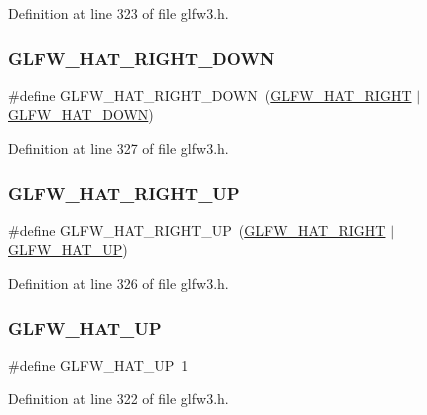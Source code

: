 Definition at line 323 of file glfw3.\+h.

\mbox{\label{group__hat__state_gad7f0e4f52fd68d734863aaeadab3a3f5}} 
\subsubsection{\texorpdfstring{GLFW\_HAT\_RIGHT\_DOWN}{GLFW\_HAT\_RIGHT\_DOWN}}
{\footnotesize\ttfamily \#define G\+L\+F\+W\+\_\+\+H\+A\+T\+\_\+\+R\+I\+G\+H\+T\+\_\+\+D\+O\+WN~(\mbox{\hyperlink{group__hat__state_ga252586e3bbde75f4b0e07ad3124867f5}{G\+L\+F\+W\+\_\+\+H\+A\+T\+\_\+\+R\+I\+G\+HT}} $\vert$ \mbox{\hyperlink{group__hat__state_gad60d1fd0dc85c18f2642cbae96d3deff}{G\+L\+F\+W\+\_\+\+H\+A\+T\+\_\+\+D\+O\+WN}})}



Definition at line 327 of file glfw3.\+h.

\mbox{\label{group__hat__state_ga94aea0ae241a8b902883536c592ee693}} 
\subsubsection{\texorpdfstring{GLFW\_HAT\_RIGHT\_UP}{GLFW\_HAT\_RIGHT\_UP}}
{\footnotesize\ttfamily \#define G\+L\+F\+W\+\_\+\+H\+A\+T\+\_\+\+R\+I\+G\+H\+T\+\_\+\+UP~(\mbox{\hyperlink{group__hat__state_ga252586e3bbde75f4b0e07ad3124867f5}{G\+L\+F\+W\+\_\+\+H\+A\+T\+\_\+\+R\+I\+G\+HT}} $\vert$ \mbox{\hyperlink{group__hat__state_ga8c9720c76cd1b912738159ed74c85b36}{G\+L\+F\+W\+\_\+\+H\+A\+T\+\_\+\+UP}})}



Definition at line 326 of file glfw3.\+h.

\mbox{\label{group__hat__state_ga8c9720c76cd1b912738159ed74c85b36}} 
\subsubsection{\texorpdfstring{GLFW\_HAT\_UP}{GLFW\_HAT\_UP}}
{\footnotesize\ttfamily \#define G\+L\+F\+W\+\_\+\+H\+A\+T\+\_\+\+UP~1}



Definition at line 322 of file glfw3.\+h.

